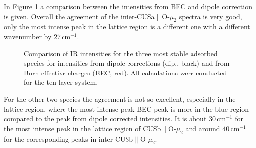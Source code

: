 \documentclass[11pt,DIV=13,BCOR=5mm,a4paper,headinclude]{scrbook}
\begin{document}
In Figure \ref{abb:bec-dip-comp} a comparison between the intensities from BEC and dipole correction is given.
Overall the agreement of the inter-CUSa$\parallel$O-$\mu_2$ spectra is very good, only the most intense peak in the lattice region is a different one with a different wavenumber by $27\,$cm$^{-1}$.
\begin{figure}[!h]
    \centering
              \quad
             \quad
             \caption{Comparison of IR intensities for the three most stable adsorbed species for intensities from dipole corrections (dip., black) and from Born effective charges (BEC, red).
             All calculations were conducted for the ten layer system.}
            \label{abb:bec-dip-comp}
\end{figure}
For the other two species the agreement is not so excellent, especially in the lattice region, where the most intense peak BEC peak is more in the blue region compared to the peak from dipole corrected intensities.
It is about $30\,$cm$^{-1}$ for the most intense peak in the lattice region of CUSb$\parallel$O-$\mu_2$ and around $40\,$cm$^{-1}$ for the corresponding peaks in inter-CUSb$\parallel$O-$\mu_2$.
\end{document}
